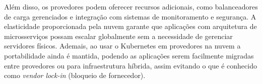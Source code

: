 Além disso, os provedores podem oferecer recursos adicionais, como balanceadores de carga gerenciados e integração com sistemas de monitoramento e segurança. A elasticidade proporcionada pela nuvem garante que aplicações com arquitetura de microsserviços possam escalar globalmente sem a necessidade de gerenciar servidores físicos. Ademais, ao usar o Kubernetes em provedores na nuvem a portabilidade ainda é mantida, podendo as aplicações serem facilmente migradas entre provedores ou para infraestrutura híbrida, assim evitando o que é conhecido como \emph{vendor lock-in} (bloqueio de fornecedor).










